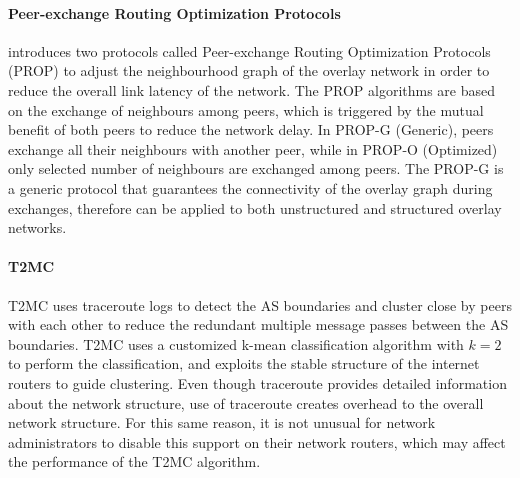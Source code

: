 \documentclass[acmcsur]{acmtrans2m}
\begin{document}


\paragraph*{\bf Peer-exchange Routing Optimization Protocols}

\cite{qiu_prop_2007} introduces two protocols called Peer-exchange Routing
Optimization Protocols (PROP) to adjust the neighbourhood graph of the overlay
network in order to reduce the overall link latency of the network. The PROP
algorithms are based on the exchange of neighbours among peers, which is
triggered by the mutual benefit of both peers to reduce the network delay.  In
PROP-G (Generic), peers exchange all their neighbours with another peer, while
in PROP-O (Optimized) only selected number of neighbours are exchanged among
peers. The PROP-G is a generic protocol that guarantees the connectivity of the
overlay graph during exchanges, therefore can be applied to both unstructured
and structured overlay networks. 


\paragraph*{\bf T2MC}

T2MC \cite{shi_t2mc_2008} uses traceroute logs to detect the AS boundaries and
cluster close by peers with each other to reduce the redundant multiple message
passes between the AS boundaries. T2MC uses a customized k-mean classification
algorithm with $k=2$ to perform the classification, and exploits the stable
structure of the internet routers to guide clustering.
Even though traceroute provides detailed information about the network
structure, use of traceroute creates overhead to the overall network structure.
For this same reason, it is not unusual for network administrators to disable
this support on their network routers, which may affect the performance of the
T2MC algorithm. 
\end{document}
